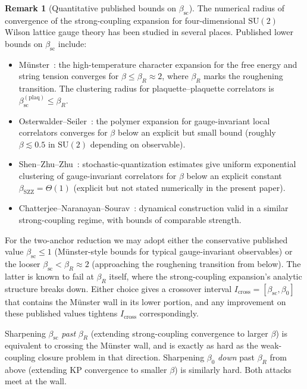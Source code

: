 \documentclass[11pt]{article}
\theoremstyle{definition}
\newtheorem{remark}[theorem]{Remark}
\newcommand{\SU}{\mathrm{SU}}
\newcommand{\betasc}{\beta_{\mathrm{sc}}}
\begin{document}
\begin{remark}[Quantitative published bounds on $\betasc$]
\label{rem:beta-sc-quantitative}
The numerical radius of convergence of the strong-coupling expansion
for four-dimensional $\SU(2)$ Wilson lattice gauge theory has been
studied in several places.  Published lower bounds on $\betasc$ include:

\begin{itemize}[nosep]
\item M\"unster~\cite{Munster81}: the high-temperature character
expansion for the free energy and string tension converges for
$\beta\le\beta_R\approx 2$, where $\beta_R$ marks the roughening
transition. The clustering radius for plaquette--plaquette
correlators is $\betasc^{(\mathrm{plaq})}\le\beta_R$.
\item Osterwalder--Seiler~\cite{OS78}: the polymer expansion for
gauge-invariant local correlators converges for $\beta$ below an
explicit but small bound \textup{(}roughly $\beta\lesssim 0.5$ in
$\SU(2)$ depending on observable\textup{)}.
\item Shen--Zhu--Zhu~\cite{SZZ22}: stochastic-quantization estimates
give uniform exponential clustering of gauge-invariant correlators
for $\beta$ below an explicit constant
$\beta_{\mathrm{SZZ}}=\Theta(1)$ \textup{(}explicit but not stated
numerically in the present paper\textup{)}.
\item Chatterjee--Naranayan--Sourav~\cite{CNS25}: dynamical
construction valid in a similar strong-coupling regime, with bounds
of comparable strength.
\end{itemize}

For the two-anchor reduction we may adopt either the conservative
published value $\betasc\le 1$ (Münster-style bounds for typical
gauge-invariant observables) or the looser $\betasc < \beta_R\approx 2$
(approaching the roughening transition from below).  The latter is
known to fail at $\beta_R$ itself, where the strong-coupling
expansion's analytic structure breaks down.  Either choice gives a
crossover interval $I_{\mathrm{cross}}=[\betasc,\beta_0]$ that
contains the M\"unster wall in its lower portion, and any improvement
on these published values tightens $I_{\mathrm{cross}}$ correspondingly.

Sharpening $\betasc$ \emph{past} $\beta_R$ (extending strong-coupling
convergence to larger $\beta$) is equivalent to crossing the M\"unster
wall, and is exactly as hard as the weak-coupling closure problem in
that direction.  Sharpening $\beta_0$ \emph{down} past $\beta_R$ from
above (extending KP convergence to smaller $\beta$) is similarly
hard.  Both attacks meet at the wall.
\end{remark}
\end{document}
